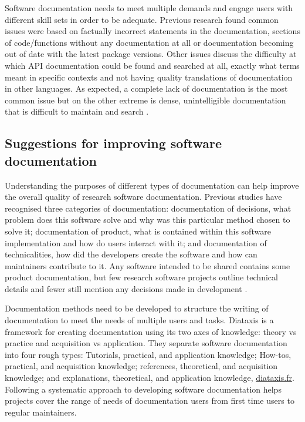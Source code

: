 \documentclass[../main.tex]{subfiles}
\begin{document}
Software documentation needs to meet multiple demands and engage users with different skill sets in order to be adequate.
Previous research found common issues were based on factually incorrect statements in the documentation, sections of code/functions without any documentation at all or documentation becoming out of date with the latest package versions.
Other issues discuss the difficulty at which API documentation could be found and searched at all, exactly what terms meant in specific contexts and not having quality translations of documentation in other languages.
As expected, a complete lack of documentation is the most common issue but on the other extreme is dense, unintelligible documentation that is difficult to maintain and search \parencite{Aghajani2019}.

\subsection{Suggestions for improving software documentation}

Understanding the purposes of different types of documentation can help improve the overall quality of research software documentation.
Previous studies have recognised three categories of documentation: documentation of decisions, what problem does this software solve and why was this particular method chosen to solve it; documentation of product, what is contained within this software implementation and how do users interact with it; and documentation of technicalities, how did the developers create the software and how can maintainers contribute to it. 
Any software intended to be shared contains some product documentation, but few research software projects outline technical details and fewer still mention any decisions made in development \parencite{Geiger2018}.

Documentation methods need to be developed to structure the writing of documentation to meet the needs of multiple users and tasks.
Diataxis is a framework for creating documentation using its two axes of knowledge: theory vs practice and acquisition vs application. 
They separate software documentation into four rough types: Tutorials, practical, and application knowledge; How-tos, practical, and acquisition knowledge; references, theoretical, and acquisition knowledge; and explanations, theoretical, and application knowledge, \href{https://diataxis.fr/}{diataxis.fr}.
Following a systematic approach to developing software documentation helps projects cover the range of needs of documentation users from first time users to regular maintainers.
\end{document}
